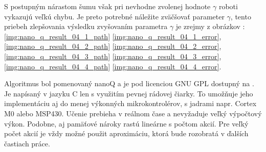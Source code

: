S postupným nárastom šumu však pri nevhodne zvolenej hodnote $\gamma$
roboti vykazujú veľkú chybu. Je preto potrebné náležite zväčšovať
parameter $\gamma$, tento priebeh zlepšovania výsledku zvyšovaním parametra $\gamma$
je zrejmy z obrázkov :
\ref{img:nano_q_result_04_1_path}
\ref{img:nano_q_result_04_1_error},
\ref{img:nano_q_result_04_2_path}
\ref{img:nano_q_result_04_2_error},
\ref{img:nano_q_result_04_3_path}
\ref{img:nano_q_result_04_3_error},
\ref{img:nano_q_result_04_4_path}
\ref{img:nano_q_result_04_4_error}.

Algoritmus bol pomenovaný nanoQ a je pod licenciou GNU GPL dostupný na \cite{bib:nano_q_link}.
Je napísaný v jazyku C len s využitím pevnej rádovej čiarky. To umožňuje jeho implementáciu
aj do menej výkonných mikrokontrolérov, s jadrami napr. Cortex M0 alebo MSP430. Učenie
prebieha v reálnom čase a nevyžaduje veľký výpočtový výkon. Podobne, aj pamäťové nároky rastú
lineárne s počtom akcií. Pre veľký počet akcií je vždy možné použit aproximáciu, ktorá bude rozobratá
v ďalších častiach práce.
